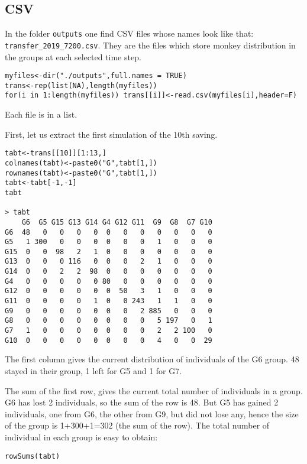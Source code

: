 \subsection{CSV}

In the folder \texttt{outputs} one find CSV files whose names look like that: \texttt{transfer\_2019\_7200.csv}. They are the files which store monkey distribution in the groups at each selected time step.

\begin{lstlisting}
myfiles<-dir("./outputs",full.names = TRUE)
trans<-rep(list(NA),length(myfiles))
for(i in 1:length(myfiles)) trans[[i]]<-read.csv(myfiles[i],header=F)
\end{lstlisting}

Each file is in a list.

First, let us extract the first simulation of the 10th saving.

\begin{lstlisting}
tabt<-trans[[10]][1:13,]
colnames(tabt)<-paste0("G",tabt[1,])
rownames(tabt)<-paste0("G",tabt[1,])
tabt<-tabt[-1,-1]
tabt

> tabt
    G6  G5 G15 G13 G14 G4 G12 G11  G9  G8  G7 G10
G6  48   0   0   0   0  0   0   0   0   0   0   0
G5   1 300   0   0   0  0   0   0   1   0   0   0
G15  0   0  98   2   1  0   0   0   0   0   0   0
G13  0   0   0 116   0  0   0   2   1   0   0   0
G14  0   0   2   2  98  0   0   0   0   0   0   0
G4   0   0   0   0   0 80   0   0   0   0   0   0
G12  0   0   0   0   0  0  50   3   1   0   0   0
G11  0   0   0   0   1  0   0 243   1   1   0   0
G9   0   0   0   0   0  0   0   2 885   0   0   0
G8   0   0   0   0   0  0   0   0   5 197   0   1
G7   1   0   0   0   0  0   0   0   2   2 100   0
G10  0   0   0   0   0  0   0   0   4   0   0  29
\end{lstlisting}

The first column gives the current distribution of individuals of the G6 group. 48 stayed in their group, 1 left for G5 and 1 for G7. 

The sum of the first row, gives the current total number of individuals in a group. G6 has lost 2 individuals, so the sum of the row is 48. But G5 has gained 2 individuals, one from G6, the other from G9, but did not lose any, hence the size of the group is 1+300+1=302 (the sum of the row). The total number of individual in each group is easy to obtain:

\begin{lstlisting}
rowSums(tabt)
\end{lstlisting}
 

